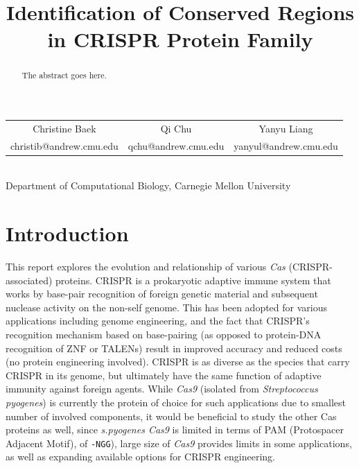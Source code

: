 \documentclass[11pt, oneside]{article}
\begin{document}
\title{\textbf{Identification of Conserved Regions\\ in CRISPR Protein Family}\\ }

\maketitle

\begin{center}
\begin{tabular}{ c c c }
 Christine Baek & Qi Chu & Yanyu Liang \\ 
christib@andrew.cmu.edu & qchu@andrew.cmu.edu & yanyul@andrew.cmu.edu \\     
\end{tabular}\\
\smallskip
\smallskip
Department of Computational Biology, Carnegie Mellon University
\end{center}

\bigskip

\begin{abstract}
The abstract goes here.
\end{abstract}



\section{Introduction}
This report explores the evolution and relationship of various \textit{Cas} (CRISPR-associated) proteins. CRISPR is a prokaryotic adaptive immune system that works by base-pair recognition of foreign genetic material and subsequent nuclease activity on the non-self genome. This has been adopted for various applications including genome engineering, and the fact that CRISPR's recognition mechanism based on base-pairing (as opposed to protein-DNA recognition of ZNF or TALENs) result in improved accuracy and reduced costs (no protein engineering involved). CRISPR is as diverse as the species that carry CRISPR in its genome, but ultimately have the same function of adaptive immunity against foreign agents. While \textit{Cas9} (isolated from \textit{Streptococcus pyogenes}) is currently the  protein of choice for such applications due to smallest number of involved components, it would be beneficial to study the other Cas proteins as well, since \textit{s.pyogenes Cas9} is limited in terms of PAM (Protospacer Adjacent Motif), of \texttt{-NGG}), large size of \textit{Cas9} provides limits in some applications, as well as expanding available options for CRISPR engineering. 
\end{document}
